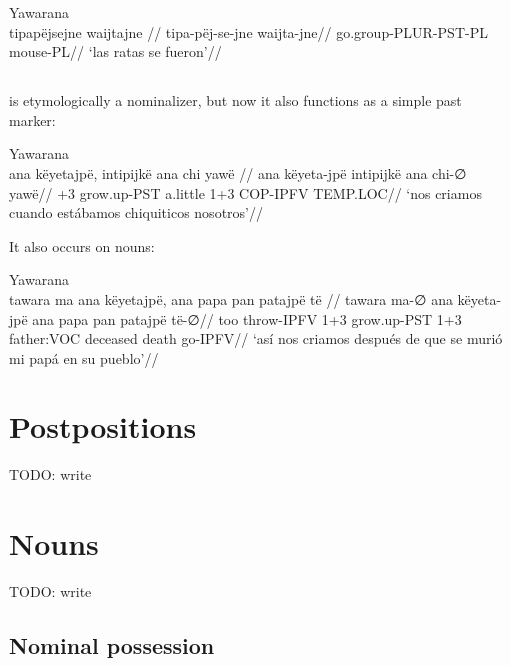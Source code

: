 \documentclass{article}
\begin{document}
 Yawarana \\
\begingl
\glpreamble  tipapëjsejne waijtajne //
\gla tipa-pëj-se-jne waijta-jne//
\glb go.group-PLUR-PST-PL mouse-PL//
\glft ‘las ratas se fueron’//  
\endgl 
\xe

\subsection{}

 is etymologically a nominalizer, but now it also functions as
a simple past marker:

 Yawarana \\
\begingl
\glpreamble  ana këyetajpë, intipijkë ana chi yawë //
\gla ana këyeta-jpë intipijkë ana chi-∅ yawë//
+3 grow.up-PST a.little 1+3 COP-IPFV TEMP.LOC//
\glft ‘nos criamos cuando estábamos chiquiticos nosotros’//  
\endgl 
\xe

It also occurs on nouns:

 Yawarana \\
\begingl
\glpreamble  tawara ma ana këyetajpë, ana papa pan patajpë të //
\gla tawara ma-∅ ana këyeta-jpë ana papa pan patajpë të-∅//
\glb too throw-IPFV 1+3 grow.up-PST 1+3 father:VOC deceased death go-IPFV//
\glft ‘así nos criamos después de que se murió mi papá en su pueblo’//  
\endgl 
\xe

\section{Postpositions}

TODO: write

\section{Nouns}

TODO: write

\subsection{Nominal possession}

\printbibliography

% 
% 
% 
% 
% 
% 
% 
% 
% 
\end{document}
